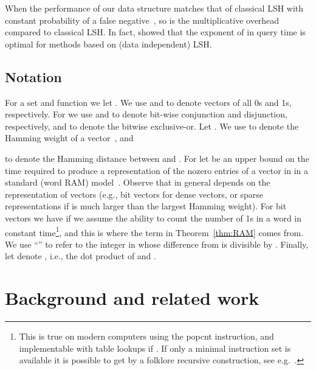 \documentclass[prodmode,acmtalg]{acmsmall}
\begin{document}
When  the performance of our data structure matches that of classical LSH with constant probability of a false negative~\cite{Indyk1998,gionis1999similarity}, so  is the multiplicative overhead compared to classical LSH.
In fact, \cite{o2014optimal} showed that the exponent of  in query time is optimal for methods based on (data independent) LSH.


\subsection{Notation}

For a set  and function  we let .
We use  and  to denote vectors of all 0s and 1s, respectively. 
For  we use  and  to denote bit-wise conjunction and disjunction, respectively, and  to denote the bitwise exclusive-or.
Let .
We use  to denote the Hamming weight of a vector~, and 

to denote the Hamming distance between  and .
For  let  be an upper bound on the time required to produce a representation of the nozero entries of a vector in  in a standard (word RAM) model~\cite{word-RAM}.
Observe that in general  depends on the representation of vectors (e.g., bit vectors for dense vectors, or sparse representations if  is much larger than the largest Hamming weight).
For bit vectors we have  if we assume the ability to count the number of 1s in a word in constant time\footnote{This is true on modern computers using the {\sc popcnt} instruction, and implementable with table lookups if . 
If only a minimal instruction set is available it is possible to get  by a folklore recursive construction, see e.g.~\cite[Lemma 3.2]{hagerup2001deterministic}.}, and this is where the term  in Theorem~\ref{thm:RAM} comes from.
We use ``'' to refer to the integer in  whose difference from  is divisible by .
Finally, let  denote , i.e., the dot product of  and .




\section{Background and related work}
\end{document}
